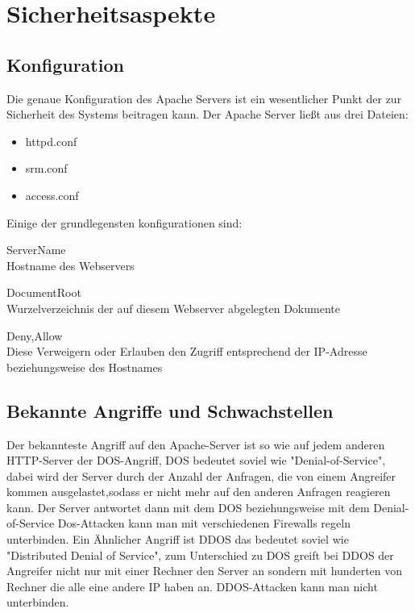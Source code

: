 \newpage


\section{Sicherheitsaspekte}

\subsection{Konfiguration}
Die genaue Konfiguration des Apache Servers ist ein wesentlicher Punkt der zur Sicherheit des Systems beitragen kann. Der Apache Server ließt aus drei Dateien:
\begin{itemize}
\item{httpd.conf}
\item{srm.conf}
\item{access.conf}
\end{itemize}
Einige der grundlegensten konfigurationen sind:
\begin{description}
\item{ServerName \\ Hostname des Webservers}
\item{DocumentRoot \\ Wurzelverzeichnis der auf diesem Webserver abgelegten 
Dokumente }
\item{Deny,Allow \\ Diese Verweigern oder Erlauben den Zugriff entsprechend der IP-Adresse beziehungsweise des Hostnames }
\end{description} 

\subsection{Bekannte Angriffe und Schwachstellen}
Der bekannteste Angriff auf den Apache-Server ist so wie auf jedem anderen HTTP-Server der DOS-Angriff, DOS bedeutet soviel wie "Denial-of-Service", dabei wird der Server durch der Anzahl der Anfragen, die von einem Angreifer kommen ausgelastet,sodass er nicht mehr auf den anderen Anfragen reagieren kann. Der Server antwortet dann mit dem DOS beziehungsweise mit dem Denial-of-Service Dos-Attacken kann man mit verschiedenen Firewalls regeln unterbinden. Ein Ähnlicher Angriff ist DDOS das bedeutet soviel wie "Distributed Denial of Service", zum Unterschied zu DOS greift bei DDOS der Angreifer nicht nur mit einer Rechner den Server an sondern mit hunderten von Rechner die alle eine andere IP haben an. DDOS-Attacken kann man nicht unterbinden.
